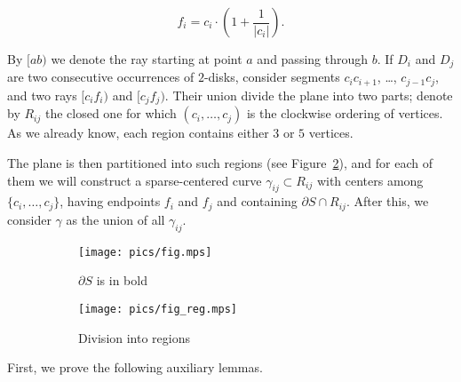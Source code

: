 $$f_i = c_i\cdot\left(1 + \frac{1}{|c_i|}\right).$$

By $[ab)$ we denote the ray starting at point $a$ and passing through $b$. If $D_i$ and $D_j$ are two consecutive occurrences of $2$-disks, consider segments $c_ic_{i+1}$, \ldots, $c_{j-1}c_j$, and two rays $[c_if_i)$ and $[c_jf_j)$. Their union divide the plane into two parts; denote by $R_{ij}$ the closed one for which $(c_i, \ldots, c_j)$ is the clockwise ordering of vertices.
As we already know, each region contains either $3$ or $5$ vertices.

The plane is then partitioned into such regions (see Figure~\ref{fig:division-into-regions}), and for each of them we will construct a sparse-centered curve $\gamma_{ij}\subset R_{ij}$ with centers among $\{c_i, \ldots, c_j\}$, having endpoints $f_i$ and $f_j$ and containing $\partial S\cap R_{ij}$. After this, we consider $\gamma$ as the union of all $\gamma_{ij}$.

\begin{figure}[h!]
    \centering
    \begin{subfigure}{.4\textwidth}
    \texttt{[image: pics/fig.mps]}
    \caption{$\partial{S}$ is in bold}
    \label{fig:partial-s}
    \end{subfigure}
    \begin{subfigure}{.4\textwidth}
    \texttt{[image: pics/fig\_reg.mps]}
    \caption{Division into regions}
    \label{fig:division-into-regions}
    \end{subfigure}
    \caption{}
    \label{fig:regions}
\end{figure}



First, we prove the following auxiliary lemmas.

